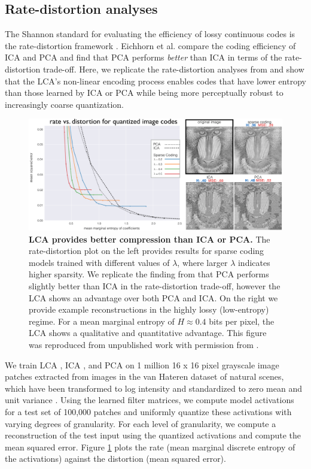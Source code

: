 \subsection{Rate-distortion analyses}
The Shannon standard for evaluating the efficiency of lossy continuous codes is the rate-distortion framework \parencite{cover2012elements}. Eichhorn et al. \citeyearpar{eichhorn2009natural} compare the  coding efficiency of ICA and PCA and find that PCA performs \textit{better} than ICA in terms of the rate-distortion trade-off. Here, we replicate the rate-distortion analyses from \parencite{eichhorn2009natural} and show that the LCA's non-linear encoding process enables codes that have lower entropy than those learned by ICA or PCA while being more perceptually robust to increasingly coarse quantization.

\begin{figure}[ht]
    \centering
    \includegraphics[width=\textwidth]{figures/rate_distortion.png}
    \caption{\textbf{LCA provides better compression than ICA or PCA.} The rate-distortion plot on the left provides results for sparse coding models trained with different values of $\lambda$, where larger $\lambda$ indicates higher sparsity. We replicate the finding from \parencite{eichhorn2009natural} that PCA performs slightly better than ICA in the rate-distortion trade-off, however the LCA shows an advantage over both PCA and ICA. On the right we provide example reconstructions in the highly lossy (low-entropy) regime. For a mean marginal entropy of $H \approx 0.4$ bits per pixel, the LCA shows a qualitative and quantitative advantage. This figure was reproduced from unpublished work with permission from \parencite{sanborn2016sampling}.}
    \label{fig:ch4_rate_distortion}
\end{figure}

We train LCA \parencite{rozell2008sparse}, ICA \parencite{bell1997independent}, and PCA on 1 million 16 x 16 pixel grayscale image patches extracted from images in the van Hateren dataset of natural scenes, which have been transformed to log intensity and standardized to zero mean and unit variance \parencite{hateren1998independent}. Using the learned filter matrices, we compute model activations for a test set of 100,000 patches and uniformly quantize these activations with varying degrees of granularity. For each level of granularity, we compute a reconstruction of the test input using the quantized activations and compute the mean squared error. Figure \ref{fig:ch4_rate_distortion} plots the rate (mean marginal discrete entropy of the activations) against the distortion (mean squared error).


